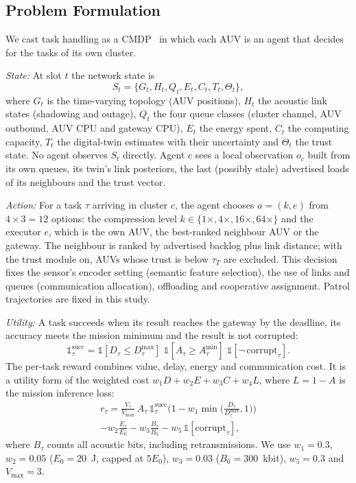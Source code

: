\documentclass[lettersize,journal]{IEEEtran}
\newcommand{\Dmax}{D^{\max}}
\newcommand{\Amin}{A^{\min}}
\begin{document}
\subsection{Problem Formulation}\label{sec:problem}
We cast task handling as a CMDP~\cite{altman1999cmdp} in which each AUV is an agent that decides for the tasks of its own cluster.

\emph{State:} At slot $t$ the network state is
\begin{equation}
S_t = \{G_t, H_t, Q_t, E_t, C_t, T_t, \Theta_t\},
\end{equation}
where $G_t$ is the time-varying topology (AUV positions), $H_t$ the acoustic link states (shadowing and outage), $Q_t$ the four queue classes (cluster channel, AUV outbound, AUV CPU and gateway CPU), $E_t$ the energy spent, $C_t$ the computing capacity, $T_t$ the digital-twin estimates with their uncertainty and $\Theta_t$ the trust state. No agent observes $S_t$ directly. Agent $c$ sees a local observation $o_c$ built from its own queues, its twin's link posteriors, the last (possibly stale) advertised loads of its neighbours and the trust vector.

\emph{Action:} For a task $\tau$ arriving in cluster $c$, the agent chooses $a=(k,e)$ from $4\times3=12$ options: the compression level $k\in\{1\times,4\times,16\times,64\times\}$ and the executor $e$, which is the own AUV, the best-ranked neighbour AUV or the gateway. The neighbour is ranked by advertised backlog plus link distance; with the trust module on, AUVs whose trust is below $\tau_T$ are excluded. This decision fixes the sensor's encoder setting (semantic feature selection), the use of links and queues (communication allocation), offloading and cooperative assignment. Patrol trajectories are fixed in this study.

\emph{Utility:} A task succeeds when its result reaches the gateway by the deadline, its accuracy meets the mission minimum and the result is not corrupted:
\begin{equation}
\mathbb{1}^{\mathrm{succ}}_\tau = \mathbb{1}[D_\tau \le \Dmax_\tau]\;\mathbb{1}[A_\tau \ge \Amin_\tau]\;\mathbb{1}[\neg\,\mathrm{corrupt}_\tau].
\end{equation}
The per-task reward combines value, delay, energy and communication cost. It is a utility form of the weighted cost $w_1D+w_2E+w_3C+w_4L$, where $L=1-A$ is the mission inference loss:
\begin{multline}
r_\tau = \frac{V_\tau}{V_{\max}}\, A_\tau\, \mathbb{1}^{\mathrm{succ}}_\tau \Big(1 - w_1 \min\!\big(\tfrac{D_\tau}{\Dmax_\tau},1\big)\Big) \\
- w_2 \frac{E_\tau}{E_0} - w_3 \frac{B_\tau}{B_0} - w_5\,\mathbb{1}[\mathrm{corrupt}_\tau],
\end{multline}
where $B_\tau$ counts all acoustic bits, including retransmissions. We use $w_1=0.3$, $w_2=0.05$ ($E_0=20$~J, capped at $5E_0$), $w_3=0.03$ ($B_0=300$~kbit), $w_5=0.3$ and $V_{\max}=3$.
\end{document}
